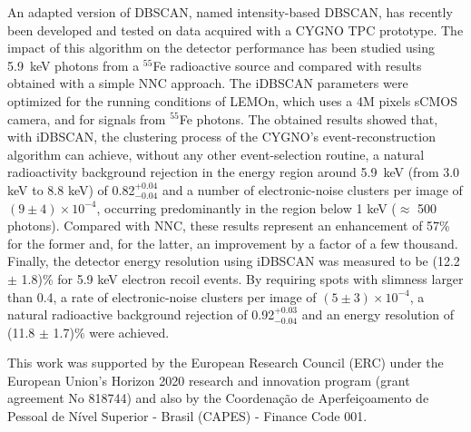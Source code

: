 \documentclass[a4paper,11pt]{article}
\begin{document}
An adapted version of DBSCAN, named intensity-based DBSCAN, has recently been developed and tested on data acquired with a CYGNO TPC prototype. The impact of this algorithm on the detector performance has been studied using 5.9~keV photons from a $^{55}$Fe radioactive source and compared with results obtained with a simple NNC approach.
The iDBSCAN parameters were optimized for the running conditions of LEMOn, which uses a 4M pixels sCMOS camera, and for signals from $^{55}$Fe photons.
The obtained results showed that, with iDBSCAN, the clustering process of the CYGNO's event-reconstruction algorithm can achieve, without any other event-selection routine, a natural radioactivity background rejection in the energy region around 5.9~keV (from 3.0 keV to 8.8 keV) of 0.82$^{+0.04}_{-0.04}$ and a number of electronic-noise clusters per image of $(9 \pm 4)\times 10^{-4}$, occurring predominantly in the region below 1 keV ($\approx$ 500 photons).
Compared with NNC, these results represent an enhancement of 57\% for the former and, for the latter, an improvement by a factor of a few thousand. 
Finally, the detector energy resolution using iDBSCAN was measured to be (12.2 $\pm$ 1.8)\% for 5.9 keV electron recoil events. By requiring spots with slimness larger than 0.4, a rate of electronic-noise clusters per image of $(5 \pm 3)\times 10^{-4}$, a natural radioactive background rejection of 0.92$^{+0.03}_{-0.04}$ and an energy resolution of (11.8 $\pm$ 1.7)\% were achieved.

\acknowledgments
This work was supported by the European Research Council (ERC) under the European Union’s Horizon 2020 research and innovation program (grant agreement No 818744) and also by the Coordenação de Aperfeiçoamento de Pessoal de Nível Superior - Brasil (CAPES) - Finance Code 001.




\end{document}
